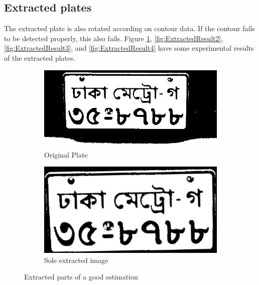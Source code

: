 \subsection{Extracted plates}
The extracted plate is also rotated according on contour data. If the contour fails to be detected properly, this also fails. Figure \ref{fig:ExtractedResult1}, \ref{fig:ExtractedResult2}, \ref{fig:ExtractedResult3}, and \ref{fig:ExtractedResult4} have some experimental results of the extracted plates.

\begin{figure}
\begin{subfigure}{0.5\textwidth}
    \centering
    \includegraphics[width=0.9\linewidth]{./img/experiment/stage.10/00-good}
    \caption{Original Plate}
\end{subfigure}
\begin{subfigure}{0.5\textwidth}
    \centering
    \includegraphics[width=0.9\linewidth]{./img/experiment/stage.13/00-00-good}
    \caption{Sole extracted image}
\end{subfigure}
\caption{Extracted parts of a good estimation}
\label{fig:ExtractedResult1}
\end{figure}

